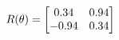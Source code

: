 \documentclass[preview]{standalone}
\begin{document}
\begin{align*}
\special{dvisvgm:raw <g id='unique000'>}R(\theta) = \begin{bmatrix}0.34 & 0.94\\-0.94 & 0.34\end{bmatrix}\special{dvisvgm:raw </g>}
\end{align*}
\end{document}
